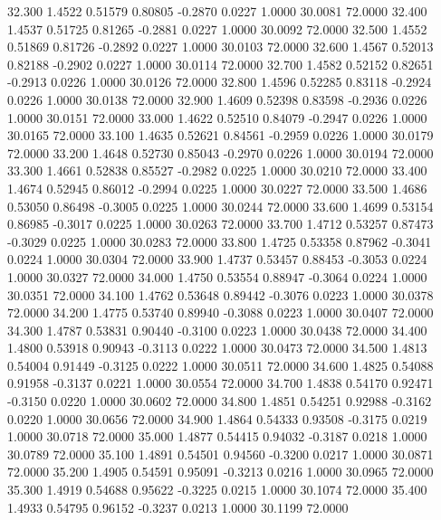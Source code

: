   32.300   1.4522   0.51579   0.80805  -0.2870   0.0227   1.0000  30.0081  72.0000
  32.400   1.4537   0.51725   0.81265  -0.2881   0.0227   1.0000  30.0092  72.0000
  32.500   1.4552   0.51869   0.81726  -0.2892   0.0227   1.0000  30.0103  72.0000
  32.600   1.4567   0.52013   0.82188  -0.2902   0.0227   1.0000  30.0114  72.0000
  32.700   1.4582   0.52152   0.82651  -0.2913   0.0226   1.0000  30.0126  72.0000
  32.800   1.4596   0.52285   0.83118  -0.2924   0.0226   1.0000  30.0138  72.0000
  32.900   1.4609   0.52398   0.83598  -0.2936   0.0226   1.0000  30.0151  72.0000
  33.000   1.4622   0.52510   0.84079  -0.2947   0.0226   1.0000  30.0165  72.0000
  33.100   1.4635   0.52621   0.84561  -0.2959   0.0226   1.0000  30.0179  72.0000
  33.200   1.4648   0.52730   0.85043  -0.2970   0.0226   1.0000  30.0194  72.0000
  33.300   1.4661   0.52838   0.85527  -0.2982   0.0225   1.0000  30.0210  72.0000
  33.400   1.4674   0.52945   0.86012  -0.2994   0.0225   1.0000  30.0227  72.0000
  33.500   1.4686   0.53050   0.86498  -0.3005   0.0225   1.0000  30.0244  72.0000
  33.600   1.4699   0.53154   0.86985  -0.3017   0.0225   1.0000  30.0263  72.0000
  33.700   1.4712   0.53257   0.87473  -0.3029   0.0225   1.0000  30.0283  72.0000
  33.800   1.4725   0.53358   0.87962  -0.3041   0.0224   1.0000  30.0304  72.0000
  33.900   1.4737   0.53457   0.88453  -0.3053   0.0224   1.0000  30.0327  72.0000
  34.000   1.4750   0.53554   0.88947  -0.3064   0.0224   1.0000  30.0351  72.0000
  34.100   1.4762   0.53648   0.89442  -0.3076   0.0223   1.0000  30.0378  72.0000
  34.200   1.4775   0.53740   0.89940  -0.3088   0.0223   1.0000  30.0407  72.0000
  34.300   1.4787   0.53831   0.90440  -0.3100   0.0223   1.0000  30.0438  72.0000
  34.400   1.4800   0.53918   0.90943  -0.3113   0.0222   1.0000  30.0473  72.0000
  34.500   1.4813   0.54004   0.91449  -0.3125   0.0222   1.0000  30.0511  72.0000
  34.600   1.4825   0.54088   0.91958  -0.3137   0.0221   1.0000  30.0554  72.0000
  34.700   1.4838   0.54170   0.92471  -0.3150   0.0220   1.0000  30.0602  72.0000
  34.800   1.4851   0.54251   0.92988  -0.3162   0.0220   1.0000  30.0656  72.0000
  34.900   1.4864   0.54333   0.93508  -0.3175   0.0219   1.0000  30.0718  72.0000
  35.000   1.4877   0.54415   0.94032  -0.3187   0.0218   1.0000  30.0789  72.0000
  35.100   1.4891   0.54501   0.94560  -0.3200   0.0217   1.0000  30.0871  72.0000
  35.200   1.4905   0.54591   0.95091  -0.3213   0.0216   1.0000  30.0965  72.0000
  35.300   1.4919   0.54688   0.95622  -0.3225   0.0215   1.0000  30.1074  72.0000
  35.400   1.4933   0.54795   0.96152  -0.3237   0.0213   1.0000  30.1199  72.0000
